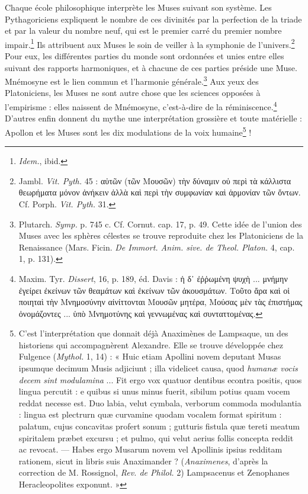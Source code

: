 \documentclass[a4paper, 11pt, oneside, polutonikogreek, french]{article}
\begin{document}
Chaque école philosophique interprète les Muses suivant son système. Les Pythagoriciens expliquent le nombre de ces divinités par la perfection de la triade et par la valeur du nombre neuf, qui est le premier carré du premier nombre impair.\footnote{\emph{Idem.}, ibid.} Ils attribuent aux Muses le soin de veiller à la symphonie de l'univers.\footnote{Jambl. \emph{Vit. Pyth.} 45 : αὐτῶν (τῶν Μουσῶν) τὴν δύναμιν οὐ περὶ τὰ κάλλιστα θεωρήματα μόνον ἀνήκειν ἀλλὰ καὶ περὶ τὴν συμφωνίαν καὶ ἁρμονίαν τῶν ὄντων. Cf. Porph. \emph{Vit. Pyth.} 31.} Pour eux, les différentes parties du monde sont ordonnées et unies entre elles suivant des rapports harmoniques, et à chacune de ces parties préside une Muse. Mnémosyne est le lien commun et l'harmonie générale.\footnote{Plutarch. \emph{Symp.} p. 745 c. Cf. Cornut. cap. 17, p. 49. Cette idée de l'union des Muses avec les sphères célestes se trouve reproduite chez les Platoniciens de la Renaissance (Mars. Ficin. \emph{De Immort. Anim. sive. de Theol. Platon.} 4, cap. 1, p. 131).} Aux yeux des Platoniciens, les Muses ne sont autre chose que les sciences opposées à l'empirisme : elles naissent de Mnémosyne, c'est-à-dire de la réminiscence.\footnote{Maxim. Tyr. \emph{Dissert}, 16, p. 189, éd. Davis : ἡ δ᾽ ἐῤῥωμένη ψυχὴ ... μνήμην ἐγείρει ἐκείνων τῶν θεαμάτων καὶ ἐκείνων τῶν ἀκουσμάτων. Τοῦτο ἄρα καὶ οἱ ποιηταὶ τὴν Μνημοσύνην αἰνίττονται Μουσῶν μητέρα, Μούσας μὲν τὰς ἐπιστήμας ὀνομάζοντες ... ὑπὸ Μνημοτύνης καὶ γεννωμένας καὶ συνταττομένας.} D'autres enfin donnent du mythe une interprétation grossière et toute matérielle : Apollon et les Muses sont les dix modulations de la voix humaine\footnote{C'est l'interprétation que donnait déjà Anaximènes de Lampsaque, un des historiens qui accompagnèrent Alexandre. Elle se trouve développée chez Fulgence (\emph{Mythol.} 1, 14) : « Huic etiam Apollini novem deputant Musas ipsumque decimum Musis adjiciunt ; illa videlicet causa, quod \emph{humanæ vocis decem sint modulamina} ... Fit ergo vox quatuor dentibus econtra positis, quos lingua percutit : e quibus si unus minus fuerit, sibilum potius quam vocem reddat necesse est. Duo labia, velut cymbala, verborum commoda modulantia : lingua est plectrurn quæ curvamine quodam vocalem format spiritum : palatum, cujus concavitas profert sonum ; gutturis fistula quæ tereti meatum spiritalem præbet excursu ; et pulmo, qui velut aerius follis concepta reddit ac revocat. --- Habes ergo Musarum novem vel Apollinis ipsius redditam rationem, sicut in libris suis Anaximander ? (\emph{Anaximenes}, d'après la correction de M. Rossignol, \emph{Rev. de Philol.} 2) Lampsacenus et Zenophanes Heracleopolites exponunt. »} !
\end{document}
